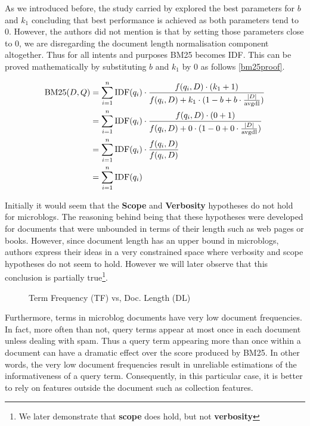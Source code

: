 As we introduced before, the study carried by \cite{ferguson2012investigation} explored the best parameters for \(b\) and \(k_1\) concluding that best performance is achieved as both parameters tend to 0. However, the authors did not mention is that by setting those parameters close to 0, we are disregarding the document length normalisation component altogether. Thus for all intents and purposes BM25 becomes IDF. This can be proved mathematically by substituting \(b\) and \(k_1\) by 0 as follows \ref{bm25proof}.

\begin{small}
\begin{align}
\label{bm25proof}
    \notag \text{BM25}(D,Q) &= \sum_{i=1}^{n} \text{IDF}(q_i) \cdot \frac{f(q_i, D) \cdot (k_1 + 1)}{f(q_i, D) + k_1 \cdot (1 - b + b \cdot \frac{|D|}{\text{avgdl}})} \\
  \notag&= \sum_{i=1}^{n} \text{IDF}(q_i) \cdot \frac{f(q_i, D) \cdot (0 + 1)}{f(q_i, D) + 0 \cdot (1 - 0 + 0 \cdot \frac{|D|}{\text{avgdl}})} \\
  \notag&= \sum_{i=1}^{n} \text{IDF}(q_i) \cdot \frac{f(q_i, D)}{f(q_i, D) } \\
  &= \sum_{i=1}^{n} \text{IDF}(q_i)              
\end{align}
\end{small}

Initially it would seem that the \textbf{Scope} and \textbf{Verbosity} hypotheses do not hold for microblogs. The reasoning behind being that these hypotheses were developed for documents that were unbounded in terms of their length such as web pages or books. However, since document length has an upper bound in microblogs, authors express their ideas in a very constrained space where verbosity and scope hypotheses do not seem to hold. However we will later observe that this conclusion is partially true\footnote{We later demonstrate that \textbf{scope} does hold, but not \textbf{verbosity}}.

\begin{figure}[]
  \centering
   
     \caption{Term Frequency (TF) vs, Doc. Length (DL)}
  \label{bm25scoretfdl}
\end{figure}

Furthermore, terms in microblog documents have very low document frequencies. In fact, more often than not, query terms appear at most once in each document unless dealing with spam. Thus a query term appearing more than once within a document can have a dramatic effect over the score produced by BM25. In other words, the very low document frequencies result in unreliable estimations of the informativeness of a query term. Consequently, in this particular case, it is better to rely on features outside the document such as collection features.

